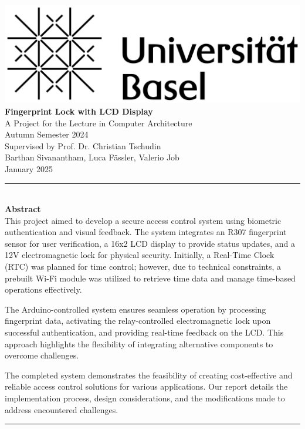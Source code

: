\documentclass{article}
\begin{document}
\begin{titlepage}
    \begin{center}
        \includegraphics[width=0.5\linewidth]{images/unibas.png} \\[5cm]
        
        {\huge \textbf{Fingerprint Lock with LCD Display}} \\[1cm]
        
        {\Large A Project for the Lecture in Computer Architecture} \\[0.2cm]
        {\Large Autumn Semester 2024} \\[0.5cm]
        
        {\large Supervised by Prof. Dr. Christian Tschudin} \\[2cm]
        
        {\large Barthan Sivanantham, Luca Fässler, Valerio Job} \\[0.5cm]
        
        {\large January 2025}
        
        \vfill
    \end{center}

    \noindent\rule{\linewidth}{0.5pt} \\[0.4cm]
    {\large \textbf{Abstract}} \\[0.4cm]
    \noindent
    \small This project aimed to develop a secure access control system using biometric authentication and visual feedback. The system integrates an R307 fingerprint sensor for user verification, a 16x2 LCD display to provide status updates, and a 12V electromagnetic lock for physical security. Initially, a Real-Time Clock (RTC) was planned for time control; however, due to technical constraints, a prebuilt Wi-Fi module was utilized to retrieve time data and manage time-based operations effectively.

    \smallskip

    The Arduino-controlled system ensures seamless operation by processing fingerprint data, activating the relay-controlled electromagnetic lock upon successful authentication, and providing real-time feedback on the LCD. This approach highlights the flexibility of integrating alternative components to overcome challenges.

    \smallskip

    The completed system demonstrates the feasibility of creating cost-effective and reliable access control solutions for various applications. Our report details the implementation process, design considerations, and the modifications made to address encountered challenges.
    
    \noindent\rule{\linewidth}{0.5pt}
\end{titlepage}
\end{document}
